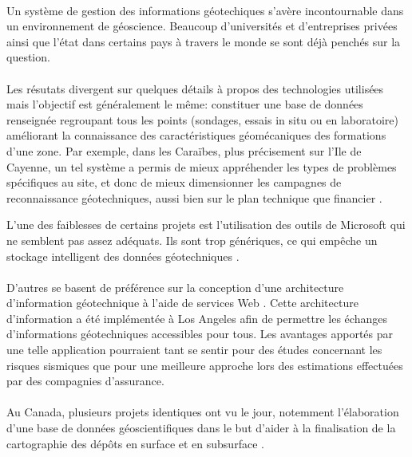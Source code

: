\paragraph{}
Un système de gestion des informations géotechiques s'avère incontournable
dans un environnement de géoscience. Beaucoup d'universités et d'entreprises 
privées ainsi que l'état dans certains pays à travers le monde se sont déjà 
penchés sur la question. 
\paragraph{}
Les résutats divergent sur quelques détails à propos des technologies utilisées mais 
l'objectif est généralement le même: 
constituer une base de données renseignée regroupant tous les points (sondages, essais
in situ ou en laboratoire) améliorant la connaissance des caractéristiques géomécaniques des
formations d'une zone.
Par exemple, dans les Caraïbes, plus précisement sur l'Ile de Cayenne, un tel système a permis
de mieux appréhender les types de problèmes
spécifiques au site, et donc de mieux dimensionner les campagnes de reconnaissance
géotechniques, aussi bien sur le plan technique que financier
\cite{cayenne}.
\par 
L'une des faiblesses de certains projets est l'utilisation des outils de Microsoft
qui ne semblent pas assez 
adéquats. Ils sont trop génériques, ce qui empêche un stockage intelligent des données géotechniques
\cite{antoljak2012subsurface}.


\paragraph{}
D'autres se basent de préférence sur la conception d'une architecture d'information 
géotechnique à l'aide de services Web
\cite{zimmermann2003design}.
Cette architecture d'information a été implémentée à Los Angeles afin de permettre les échanges 
d'informations géotechniques accessibles pour tous. Les avantages apportés par une telle 
application pourraient tant se sentir pour des études concernant les risques sismiques que pour 
une meilleure approche lors des estimations effectuées par des compagnies d'assurance. 

\paragraph{}
Au Canada, plusieurs projets identiques ont vu le jour, notemment l'élabora\-tion d'une base 
de données géoscientifiques dans le but d’aider à la finalisation de la 
cartographie des dépôts en surface et en subsurface
\cite{russell1996regional}.

